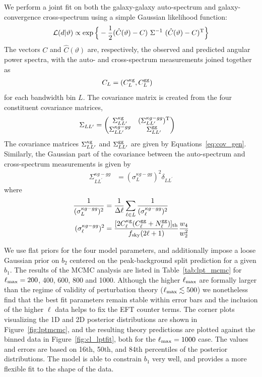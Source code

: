 We perform a joint fit on both the galaxy-galaxy auto-spectrum and galaxy-convergence cross-spectrum using a simple Gaussian likelihood function:
\begin{align}
    \mathcal{L}(d|\vartheta) \propto \exp {\Big \{ }-\frac{1}{2}(\hat{C}(\vartheta) - {C}) \ {\Sigma}^{-1} \ (\hat{C}(\vartheta) - {C})^{\rm T}{\Big \} }
\end{align}
The vectors $C$ and $\hat{C}(\vartheta)$ are, respectively, the observed and predicted angular power spectra, with the auto- and cross-spectrum measurements joined together as
\begin{align}
    {C_{L}} &= (C^{\rm \kappa g}_{L}, C^{\rm gg}_{L})
\end{align}
for each bandwidth bin $L$. The covariance matrix is created from the four constituent covariance matrices,
\begin{align}
    {\Sigma_{LL^{\prime}}} &= 
    \begin{pmatrix}
    \Sigma^{\rm \kappa g}_{LL^{\prime}} & (\Sigma^{\kappa g - gg}_{LL^{\prime}})^{\rm T} \\
    \Sigma^{\kappa g - gg}_{LL^{\prime}} & \Sigma^{\rm gg}_{LL^{\prime}}
    \end{pmatrix}
\end{align}
The covariance matrices $\Sigma^{\rm \kappa g}_{LL^{\prime}}$ and $\Sigma^{\rm gg}_{LL^{\prime}}$ are given by Equations~\ref{eq:cov_gen}. Similarly, the Gaussian part of the covariance between the auto-spectrum and cross-spectrum measurements is given by
\begin{align}
    \Sigma^{\kappa g - gg}_{LL^{\prime}} &=
     (\sigma_{L}^{\kappa g - gg})^2 \delta_{L L^{\prime}}
\end{align}
where
\begin{align}
    \frac{1}{(\sigma_{L}^{\kappa g - gg})^2} &= \frac{1}{\Delta \ell} \sum_{\ell \in L} \frac{1}{(\sigma_{\ell}^{\kappa g - gg})^2} \\
    (\sigma_{\ell}^{\kappa g - gg})^2 &= \frac{[2 C^{\rm \kappa g}_{\ell}(C^{\rm gg}_{\ell} + N^{\rm gg}_{\ell}) ]_{\rm th}}{f_{\rm sky}(2\ell + 1)}\frac{w_4}{w_2^2}
\end{align}

We use flat priors for the four model parameters, and additionally impose a loose Gaussian prior on $b_2$ centered on the peak-background split prediction for a given $b_1$. The results of the MCMC analysis are listed in Table~\ref{tab:lpt_mcmc} for $\ell_{\rm max} = 200$, 400, 600, 800 and 1000.  Although the higher $\ell_{\rm max}$ are formally larger than the regime of validity of perturbation theory ($\ell_{\rm max}\lesssim 500$) we nonetheless find that the best fit parameters remain stable within error bars and the inclusion of the higher $\ell$ data helps to fix the EFT counter terms. The corner plots visualizing the 1D and 2D posterior distributions are shown in Figure~\ref{fig:lptmcmc}, and the resulting theory predictions are plotted against the binned data in Figure~\ref{fig:cl_lptfit}, both for the $\ell_{\rm max} = 1000$ case. The values and errors are based on  16th, 50th, and 84th percentiles of the posterior distributions. The model is able to constrain $b_1$ very well, and provides a more flexible fit to the shape of the data.


